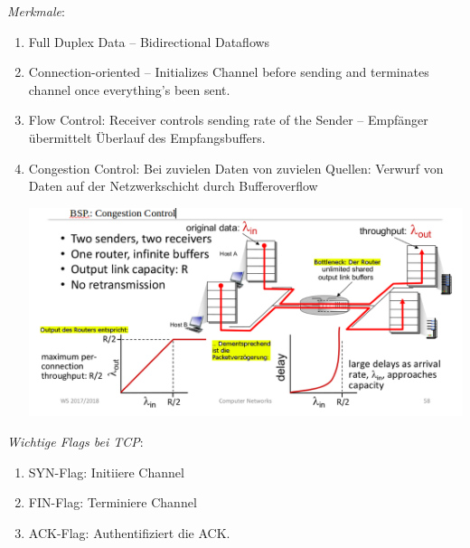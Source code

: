 \documentclass{scrartcl}
\begin{document}
    \textit{Merkmale}:
    \begin{enumerate}
        \item Full Duplex Data -- Bidirectional Dataflows
        \item Connection-oriented -- Initializes Channel before sending and terminates channel once everything's been sent.
        \item Flow Control: Receiver controls sending rate of the Sender -- Empfänger übermittelt Überlauf des Empfangsbuffers.
        \item Congestion Control: Bei zuvielen Daten von zuvielen Quellen: Verwurf von Daten auf der Netzwerkschicht durch Bufferoverflow
        \begin{center}
            \includegraphics[width=\textwidth]{CongestionControl.png}
    \end{center}
    \end{enumerate}
    
    \textit{Wichtige Flags bei TCP}:
    \begin{enumerate}
        \item SYN-Flag: Initiiere Channel
        \item FIN-Flag: Terminiere Channel
        \item ACK-Flag: Authentifiziert die ACK.
    \end{enumerate}
    
\end{document}
